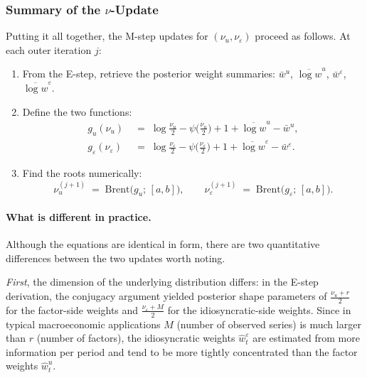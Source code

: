 \documentclass[11pt, a4paper, oneside]{article}
\begin{document}
\subsubsection{Summary of the $\nu$-Update}

Putting it all together, the M-step updates for $(\nu_u, \nu_\varepsilon)$
proceed as follows. At each outer iteration $j$:

\begin{enumerate}[leftmargin=1.5em, itemsep=3pt]
    \item From the E-step, retrieve the posterior weight summaries:
          $\bar{w}^u$, $\overline{\log w}^u$, $\bar{w}^\varepsilon$,
          $\overline{\log w}^\varepsilon$.
    \item Define the two functions:
          \begin{align*}
          g_u(\nu_u) \;&=\; \log\!\tfrac{\nu_u}{2} - \psi\!\big(\tfrac{\nu_u}{2}\big) + 1 + \overline{\log w}^u - \bar{w}^u, \\[3pt]
          g_\varepsilon(\nu_\varepsilon) \;&=\; \log\!\tfrac{\nu_\varepsilon}{2} - \psi\!\big(\tfrac{\nu_\varepsilon}{2}\big) + 1 + \overline{\log w}^\varepsilon - \bar{w}^\varepsilon.
          \end{align*}
    \item Find the roots numerically:
          \[
          \nu_u^{(j+1)} \;=\; \mathrm{Brent}\!\big(g_u;\, [a, b]\big),
          \qquad
          \nu_\varepsilon^{(j+1)} \;=\; \mathrm{Brent}\!\big(g_\varepsilon;\, [a, b]\big).
          \]
\end{enumerate}


\paragraph{What is different in practice.}
Although the equations are identical in form, there are two
quantitative differences between the two updates worth noting.

\emph{First}, the dimension of the underlying distribution differs:
in the E-step derivation, the conjugacy argument yielded posterior
shape parameters of $\tfrac{\nu_u + r}{2}$ for the factor-side weights
and $\tfrac{\nu_\varepsilon + M}{2}$ for the idiosyncratic-side weights.
Since in typical macroeconomic applications $M$ (number of observed
series) is much larger than $r$ (number of factors), the idiosyncratic
weights $\hat{w}^\varepsilon_t$ are estimated from more information per
period and tend to be more tightly concentrated than the factor weights
$\hat{w}^u_t$.
\end{document}
